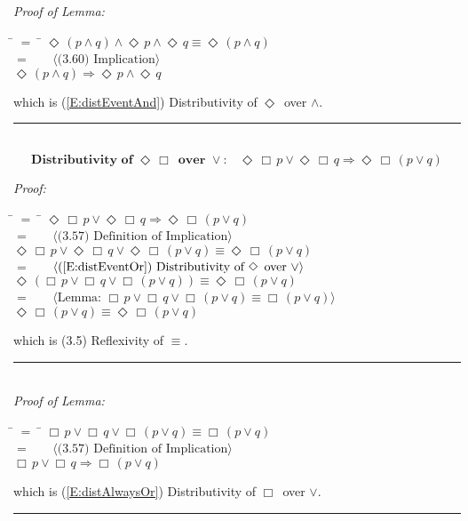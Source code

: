 \documentclass[fleqn, leqno]{article}
\newcommand{\lgap}{2pt}                             %
\newcommand{\mymathindent}{24pt}                    %
\newcommand{\Event}{\Diamond\,}
\newcommand{\Always}{\Box\,}
\newcommand{\myqed}{\hfill\rule[-.23ex]{1.2ex}{2.0ex}}
\newcommand{\Gll} {\langle}                         %
\newcommand{\Ggg} {\rangle}                         %
\newcommand{\Hint}[1]     {\ \ \ $\Gll              \mbox{#1} \Ggg$ }   %
\begin{document}
\emph{Proof of Lemma:}
\begin{tabbing}
\hspace{\mymathindent} \= $= \;$ \= \kill
  \> \>   $\Event(p \land q) \land \Event p \land \Event q \equiv \Event(p \land q)$\\[\lgap]
  \> $=$  \>  \Hint{(3.60) Implication}\\[\lgap]
  \> \>   $\Event(p \land q) \Rightarrow \Event p \land \Event q$\\[\lgap]
\end{tabbing}
which is (\ref{E:distEventAnd}) Distributivity of $\Event$ over $\land$. \myqed\\[\lgap]


\begin{equation}\label{E:distEventAlwaysOr}
\textbf{Distributivity of $\Event\Always$ over $\lor$:}\quad \Event\Always p \lor \Event\Always q \Rightarrow \Event\Always (p \lor q)
\end{equation}

\emph{Proof:}
\begin{tabbing}
\hspace{\mymathindent} \= $= \;$ \= \kill
  \> \>   $\Event\Always p \lor \Event\Always q \Rightarrow \Event\Always(p \lor q)$\\[\lgap]
  \> $=$  \>  \Hint{(3.57) Definition of Implication}\\[\lgap]
  \> \>   $\Event\Always p \lor \Event\Always q \lor \Event\Always(p \lor q) \equiv \Event\Always(p \lor q)$\\[\lgap]
  \> $=$  \>  \Hint{(\ref{E:distEventOr}) Distributivity of $\Event$ over $\lor$}\\[\lgap]
  \> \>   $\Event(\Always p \lor \Always q \lor \Always(p \lor q)) \equiv \Event\Always(p \lor q)$\\[\lgap]
  \> $=$  \>  \Hint{Lemma: $\Always p \lor \Always q \lor \Always(p \lor q) \equiv \Always(p \lor q)$}\\[\lgap]
  \> \>   $\Event\Always(p \lor q) \equiv \Event\Always(p \lor q)$\\[\lgap]
\end{tabbing}
which is (3.5) Reflexivity of $\equiv$. \myqed\\[\lgap]

\emph{Proof of Lemma:}
\begin{tabbing}
\hspace{\mymathindent} \= $= \;$ \= \kill
  \> \>   $\Always p \lor \Always q \lor \Always(p \lor q) \equiv \Always(p \lor q)$\\[\lgap]
  \> $=$  \>  \Hint{(3.57) Definition of Implication}\\[\lgap]
  \> \>   $\Always p \lor \Always q \Rightarrow \Always(p \lor q)$\\[\lgap]
\end{tabbing}
which is (\ref{E:distAlwaysOr}) Distributivity of $\Always$ over $\lor$. \myqed\\[\lgap]
\end{document}

